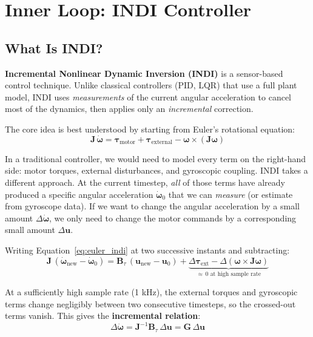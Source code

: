 \documentclass[12pt, a4paper]{article}
\newcommand{\bu}{\bm{u}}
\newcommand{\bomega}{\bm{\omega}}
\newcommand{\btau}{\bm{\tau}}
\newcommand{\bJ}{\bm{J}}
\newcommand{\bB}{\bm{B}}
\begin{document}
\section{Inner Loop: INDI Controller}
\label{sec:indi}

\subsection{What Is INDI?}

\textbf{Incremental Nonlinear Dynamic Inversion (INDI)} is a sensor-based control technique.  Unlike classical controllers (PID, LQR) that use a full plant model, INDI uses \emph{measurements} of the current angular acceleration to cancel most of the dynamics, then applies only an \emph{incremental} correction.

The core idea is best understood by starting from Euler's rotational equation:
\begin{equation}
    \bJ \, \dot{\bomega} = \btau_{\text{motor}} + \btau_{\text{external}} - \bomega \times (\bJ \bomega)
    \label{eq:euler_indi}
\end{equation}

In a traditional controller, we would need to model every term on the right-hand side: motor torques, external disturbances, and gyroscopic coupling.  INDI takes a different approach.  At the current timestep, \emph{all} of those terms have already produced a specific angular acceleration $\dot{\bomega}_0$ that we can \emph{measure} (or estimate from gyroscope data).  If we want to change the angular acceleration by a small amount $\Delta\dot{\bomega}$, we only need to change the motor commands by a corresponding small amount $\Delta\bu$.

Writing Equation~\eqref{eq:euler_indi} at two successive instants and subtracting:
\begin{equation}
    \bJ \, (\dot{\bomega}_{\text{new}} - \dot{\bomega}_0) = \bB_\tau \, (\bu_{\text{new}} - \bu_0) + \underbrace{\Delta\btau_{\text{ext}} - \Delta(\bomega \times \bJ\bomega)}_{\approx \, 0 \text{ at high sample rate}}
\end{equation}

At a sufficiently high sample rate (1 kHz), the external torques and gyroscopic terms change negligibly between two consecutive timesteps, so the crossed-out terms vanish.  This gives the \textbf{incremental relation}:
\begin{equation}
    \boxed{
    \Delta\dot{\bomega} = \bJ^{-1} \bB_\tau \, \Delta\bu = \bm{G} \, \Delta\bu
    }
    \label{eq:indi_core}
\end{equation}
\end{document}

